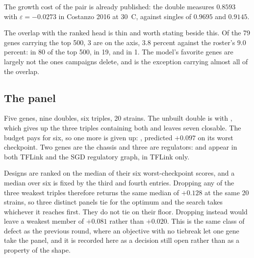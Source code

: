 The growth cost of the pair is already published: the double measures $0.8593$
with $\varepsilon = -0.0273$ in Costanzo 2016 at 30~C, against singles of
$0.9695$ and $0.9145$.

The overlap with the ranked head is thin and worth stating beside this. Of the 79
genes carrying the top 500, 3 are on the axis, $3.8$ percent against the roster's
$9.0$ percent:  in 80 of the top 500,  in 19, and
 in 1. The model's favorite genes are largely not the ones campaigns
delete, and  is the exception carrying almost all of the overlap.

\subsection{The panel}

Five genes, nine doubles, six triples, 20 strains. The unbuilt double is
 with , which gives up the three triples containing both
and leaves seven closable. The budget pays for six, so one more is given up:
  , predicted $+0.097$ on its worst checkpoint.
Two genes are the chassis and three are regulators:  and 
appear in both TFLink and the SGD regulatory graph,  in TFLink only.

Designs are ranked on the median of their six worst-checkpoint scores, and a
median over six is fixed by the third and fourth entries. Dropping any of the
three weakest triples therefore returns the same median of $+0.128$ at the same
20 strains, so three distinct panels tie for the optimum and the search takes
whichever it reaches first. They do not tie on their floor. Dropping
   instead would leave a weakest member of
$+0.081$ rather than $+0.020$. This is the same class of defect as the previous
round, where an objective with no tiebreak let one gene take the panel, and it is
recorded here as a decision still open rather than as a property of the shape.

